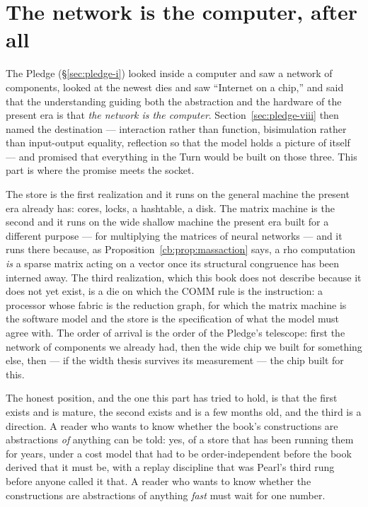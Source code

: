 \section{The network is the computer, after all}
\label{pr:sec:network}

The Pledge (\S\ref{sec:pledge-i}) looked inside a computer and saw a network of components,
looked at the newest dies and saw ``Internet on a chip,'' and said that the understanding
guiding both the abstraction and the hardware of the present era is that \emph{the network
is the computer}. Section~\ref{sec:pledge-viii} then named the destination --- interaction
rather than function, bisimulation rather than input-output equality, reflection so that the
model holds a picture of itself --- and promised that everything in the Turn would be built
on those three. This part is where the promise meets the socket.

The store is the first realization and it runs on the general machine the present era
already has: cores, locks, a hashtable, a disk. The matrix machine is the second and it runs
on the wide shallow machine the present era built for a different purpose --- for
multiplying the matrices of neural networks --- and it runs there because, as
Proposition~\ref{cb:prop:massaction} says, a rho computation \emph{is} a sparse matrix
acting on a vector once its structural congruence has been interned away. The third
realization, which this book does not describe because it does not yet exist, is a die on
which the COMM rule is the instruction: a processor whose fabric is the reduction graph,
for which the matrix machine is the software model and the store is the specification of
what the model must agree with. The order of arrival is the order of the Pledge's
telescope: first the network of components we already had, then the wide chip we built for
something else, then --- if the width thesis survives its measurement --- the chip built
for this.

The honest position, and the one this part has tried to hold, is that the first exists and
is mature, the second exists and is a few months old, and the third is a direction. A reader
who wants to know whether the book's constructions are abstractions \emph{of} anything can
be told: yes, of a store that has been running them for years, under a cost model that had
to be order-independent before the book derived that it must be, with a replay discipline
that was Pearl's third rung before anyone called it that. A reader who wants to know whether
the constructions are abstractions of anything \emph{fast} must wait for one number.

